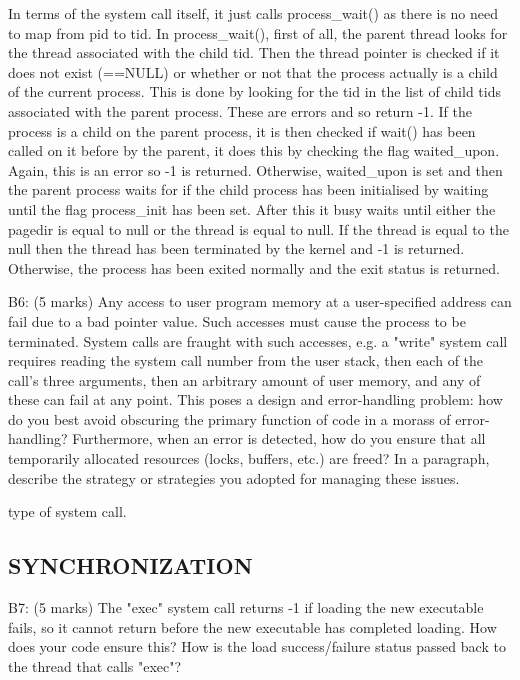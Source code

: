 In terms of the system call itself, it just calls process\_wait() as there is no need to map from pid to tid. In process\_wait(), first of all, the parent thread looks for the thread associated with the child tid. Then the thread pointer is checked if it does not exist (==NULL) or whether or not that the process actually is a child of the current process. This is done by looking for the tid in the list of child tids associated with the parent process. These are errors and so return -1.
If the process is a child on the parent process, it is then checked if wait() has been called on it before by the parent, it does this by checking the flag waited\_upon. Again, this is an error so -1 is returned. Otherwise, waited\_upon is set and then the parent process waits for if the child process has been initialised by waiting until the flag process\_init has been set. After this it busy waits until either the pagedir is equal to null or the thread is equal to null. If the thread is equal to the null then the thread has been terminated by the kernel and -1 is returned. Otherwise, the process has been exited normally and the exit status is returned.

\noindent B6: (5 marks)
Any access to user program memory at a user-specified address
can fail due to a bad pointer value.  Such accesses must cause the process to be terminated. System calls are fraught with such
accesses, e.g. a "write" system call requires reading the system
call number from the user stack, then each of the call's three
arguments, then an arbitrary amount of user memory, and any of
these can fail at any point.  This poses a design and
error-handling problem: how do you best avoid obscuring the primary
function of code in a morass of error-handling?  Furthermore, when
an error is detected, how do you ensure that all temporarily
allocated resources (locks, buffers, etc.) are freed?  In a
paragraph, describe the strategy or strategies you adopted for
managing these issues.

type of system call.



\subsection*{SYNCHRONIZATION}

\noindent B7: (5 marks)
The "exec" system call returns -1 if loading the new executable
fails, so it cannot return before the new executable has completed
loading.  How does your code ensure this?  How is the load
success/failure status passed back to the thread that calls "exec"?

